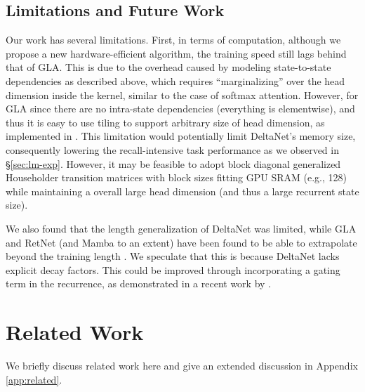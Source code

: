 \vspace{-2mm}
\subsection{Limitations and Future Work}
\label{sec:limitation}
\vspace{-2mm}
Our work has several limitations. First, in terms of computation, although we propose a new hardware-efficient algorithm, the training speed still lags behind that of GLA. This is due to the overhead caused by modeling {state-to-state dependencies} as described above, which requires ``marginalizing'' over the head dimension inside the kernel, similar to the case of softmax attention. However, for GLA since there are no intra-state dependencies (everything is elementwise), and thus it is easy to use tiling  to support arbitrary size of head dimension, as implemented in \citet{yang_fla_2024}. This limitation would potentially limit DeltaNet's memory size, consequently lowering the recall-intensive task performance as we observed in \S\ref{sec:lm-exp}. However, it may be feasible to adopt block diagonal generalized Householder transition matrices with block sizes fitting GPU SRAM (e.g., 128) while maintaining a overall large head dimension (and thus a large recurrent state size). 

We also found that the length generalization of DeltaNet was limited, while GLA and RetNet (and Mamba to an extent) have been found to be able to extrapolate beyond the training length \cite{yang_gated_2023}. We speculate that this is because DeltaNet lacks explicit decay factors. This could be improved through incorporating a gating term in the recurrence, as demonstrated in a recent work by \citet{yang2024gateddeltanetworksimproving}. 

\vspace{-2mm}
\section{Related Work}
\vspace{-2mm}
We briefly discuss related work here and give an extended
discussion  in Appendix \ref{app:related}.  


